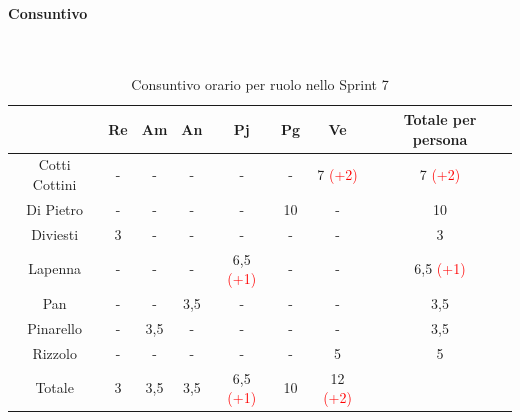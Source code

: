 \documentclass{article}
\begin{document}
                \paragraph{Consuntivo}\mbox{}\\
                \begin{table}[H]
                    \centering
                    \begin{tabular}{|c|c|c|c|c|c|c|c|}
                    \hline
                                    & Re  & Am  & An  & Pj  & Pg  & Ve  & Totale per persona \\ \hline
                    Cotti Cottini & -   & -   & -   & -   & -   & 7 \textcolor{red}{(+2)}   & 7 \textcolor{red}{(+2)}                  \\ \hline
                    Di Pietro     & -   & -   & -   & -   & 10  & -   & 10                 \\ \hline
                    Diviesti      & 3   & -   & -   & -   & -   & -   & 3                  \\ \hline
                    Lapenna       & -   & -   & -   & 6,5 \textcolor{red}{(+1)} & -   & -   & 6,5 \textcolor{red}{(+1)}               \\ \hline
                    Pan           & -   & -   & 3,5 & -   & -   & -   & 3,5                \\ \hline
                    Pinarello     & -   & 3,5 & -   & -   & -   & -   & 3,5                \\ \hline
                    Rizzolo       & -   & -   & -   & -   & -   & 5   & 5                  \\ \hline
                    Totale        & 3   & 3,5 & 3,5 & 6,5 \textcolor{red}{(+1)} & 10  & 12 \textcolor{red}{(+2)}  &                    \\ \hline
                    \end{tabular}
                    \caption{Consuntivo orario per ruolo nello Sprint 7}
                \end{table}

\end{document}
